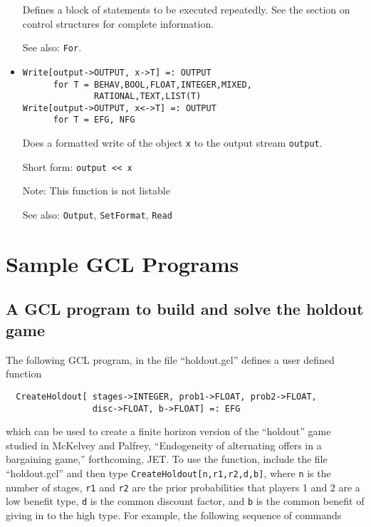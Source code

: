 \begin{itemize}
\bd
Defines a block of statements to be executed repeatedly.
See the section on control structures for complete information.
\item
[See also:] \verb+For+.
\ed

\item
\protect \large \begin{verbatim}
Write[output->OUTPUT, x->T] =: OUTPUT  
      for T = BEHAV,BOOL,FLOAT,INTEGER,MIXED,
              RATIONAL,TEXT,LIST(T)
Write[output->OUTPUT, x<->T] =: OUTPUT 
      for T = EFG, NFG
\end{verbatim}\normalsize

\bd
Does a formatted write of the object \verb+x+ to the
output stream \verb+output+.
\item
[Short form:] \verb+output << x+
\item
[Note:] This function is not listable
\item
[See also:] {\tt Output}, {\tt SetFormat}, {\tt Read}
\ed




\end{itemize}

\newpage
\section{Sample GCL Programs}

\subsection{A GCL program to build and solve the holdout game}

The following GCL program, in the file ``holdout.gcl'' defines a user
defined function

\begin{verbatim}
  CreateHoldout[ stages->INTEGER, prob1->FLOAT, prob2->FLOAT, 
                 disc->FLOAT, b->FLOAT] =: EFG
\end{verbatim}

\noindent
which can be used to create a finite horizon version of the
``holdout'' game studied in McKelvey and Palfrey, ``Endogeneity of
alternating offers in a bargaining game,'' forthcoming, JET.  To use
the function, include the file ``holdout.gcl'' and then type
\verb+CreateHoldout[n,r1,r2,d,b]+, where \verb+n+ is the number of
stages, \verb+r1+ and \verb+r2+ are the prior probabilities that
players 1 and 2 are a low benefit type, \verb+d+ is the common
discount factor, and \verb+b+ is the common benefit of giving in to
the high type.  For example, the following sequence of commands

